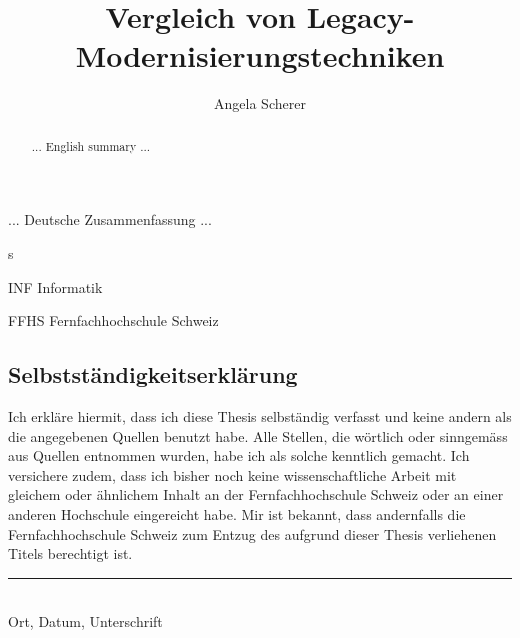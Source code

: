 \documentclass{ffhsthesis}
\begin{document}
\title{Vergleich von Legacy-Modernisierungstechniken}
\author{Angela Scherer}

\dedication{Diese Thesis widme ich\\\dots}

\maketitle


\begin{zusammenfassung}
... Deutsche Zusammenfassung ... 
\end{zusammenfassung}
s
\begin{abstract}
... English summary ...
\end{abstract}

\tableofcontents


\begin{abkuerzungen}[MUSTER]
\item[INF] Informatik
\item[FFHS] Fernfachhochschule Schweiz
\end{abkuerzungen}

\startThesis











\listoffigures

\listoftables




\newpage

\begin{appendix}



\chapter*{Selbstständigkeitserklärung}
Ich erkläre hiermit, dass ich diese Thesis selbständig verfasst 
und keine andern als die angegebenen Quellen benutzt habe. 
Alle Stellen, die wörtlich oder sinngemäss aus Quellen entnommen wurden, 
habe ich als solche kenntlich gemacht. Ich versichere zudem, dass ich bisher 
noch keine wissenschaftliche Arbeit mit gleichem oder ähnlichem Inhalt an der 
Fernfachhochschule Schweiz oder an einer anderen Hochschule eingereicht habe. 
Mir ist bekannt, dass andernfalls die Fernfachhochschule Schweiz zum Entzug 
des aufgrund dieser Thesis verliehenen Titels berechtigt ist.

\vspace{4cm}
\noindent
\hrule \ \\[-0.5ex]
Ort, Datum, Unterschrift
\end{appendix}
\end{document}

